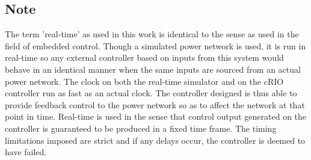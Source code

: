 \documentclass[conference]{IEEEtran}
\begin{document}

\subsection*{Note}
The term 'real-time' as used in this work is identical to the sense as used in the field of embedded control\cite{Real-Time}. Though a simulated power network is used, it is run in real-time so any external controller based on inputs from this system would behave in an identical manner when the same inputs are sourced from an actual power network. The clock on both the real-time simulator and on the cRIO controller run as fast as an actual clock. The controller designed is thus able to provide feedback control to the power network so as to affect the network at that point in time. Real-time is used in the sense that control output generated on the controller is guaranteed to be produced in a fixed time frame. The timing limitations imposed are strict and if any delays occur, the controller is deemed to have failed. 



\end{document}
